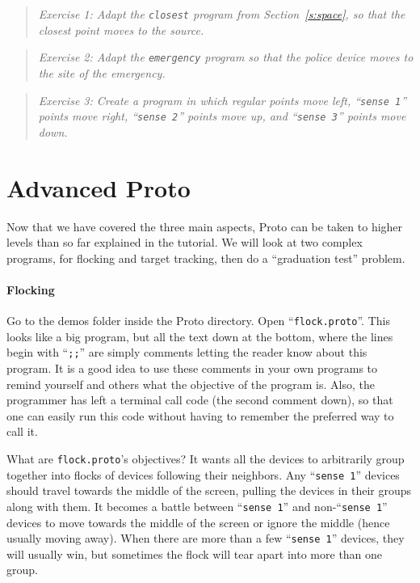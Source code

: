\documentclass{article}
\newcommand\problem[1]{\begin{quote}{\em #1}\end{quote}}
\newcommand\var[1]{{\tt #1}}
\newcommand\qvar[1]{``{\tt #1}''}
\begin{document}
\problem{Exercise 1: Adapt the \var{closest} program from
  Section~\ref{s:space}, so that the closest point moves to the
  source.}

\problem{Exercise 2: Adapt the \var{emergency} program so that the
  police device moves to the site of the emergency.}

\problem{Exercise 3: Create a program in which regular points move
  left, \qvar{sense 1} points move right, \qvar{sense 2} points move
  up, and \qvar{sense 3} points move down.}


\section{Advanced Proto}

Now that we have covered the three main aspects, Proto can be taken to
higher levels than so far explained in the tutorial.  We will look at
two complex programs, for flocking and target tracking, then do a 
``graduation test'' problem.

\paragraph{Flocking}
Go to the demos folder inside the Proto directory.  Open
\qvar{flock.proto}.  This looks like a big program, but all the text
down at the bottom, where the lines begin with \qvar{;;} are simply
comments letting the reader know about this program.  It is a good
idea to use these comments in your own programs to remind yourself and
others what the objective of the program is.  Also, the programmer has
left a terminal call code (the second comment down), so that one can
easily run this code without having to remember the preferred way to
call it.

What are \var{flock.proto}'s objectives?  It wants all the devices to
arbitrarily group together into flocks of devices following their
neighbors.  Any \qvar{sense 1} devices should travel towards the
middle of the screen, pulling the devices in their groups along with
them.  It becomes a battle between \qvar{sense 1} and non-\qvar{sense
  1} devices to move towards the middle of the screen or ignore the
middle (hence usually moving away).  When there are more than a few
\qvar{sense 1} devices, they will usually win, but sometimes the flock
will tear apart into more than one group.
\end{document}
